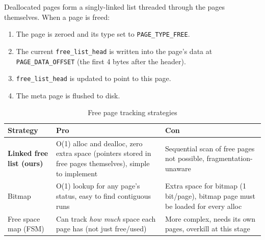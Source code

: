 \documentclass[12pt, a4paper]{report}
\begin{document}
Deallocated pages form a singly-linked list threaded through the pages
themselves. When a page is freed:

\begin{enumerate}[itemsep=2pt]
    \item The page is zeroed and its type set to \texttt{PAGE\_TYPE\_FREE}.
    \item The current \texttt{free\_list\_head} is written into the page's
          data at \texttt{PAGE\_DATA\_OFFSET} (the first 4 bytes after the
          header).
    \item \texttt{free\_list\_head} is updated to point to this page.
    \item The meta page is flushed to disk.
\end{enumerate}

\begin{center}
\end{center}

\begin{table}[h]
\centering
\begin{tabularx}{\textwidth}{lXX}
\toprule
\textbf{Strategy} & \textbf{Pro} & \textbf{Con} \\
\midrule
\textbf{Linked free list (ours)} &
    O(1) alloc and dealloc, zero extra space (pointers stored in free
    pages themselves), simple to implement &
    Sequential scan of free pages not possible, fragmentation-unaware \\
\addlinespace
Bitmap &
    O(1) lookup for any page's status, easy to find contiguous runs &
    Extra space for bitmap (1 bit/page), bitmap page must be loaded
    for every alloc \\
\addlinespace
Free space map (FSM) &
    Can track \textit{how much} space each page has (not just free/used) &
    More complex, needs its own pages, overkill at this stage \\
\bottomrule
\end{tabularx}
\caption{Free page tracking strategies}
\end{table}
\end{document}
